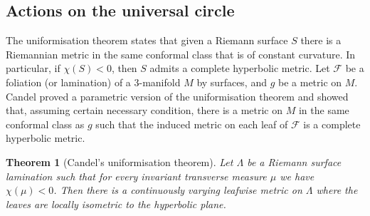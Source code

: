 \documentclass[11pt]{amsart}
\newtheorem{thm}{Theorem}[section]
\theoremstyle{remark}
\theoremstyle{definition}
\begin{document}
	\subsection{Actions on the universal circle}
	\label{sec:universal circle}
	
	The uniformisation theorem states that given a Riemann surface $S$ there is a Riemannian metric in the same conformal class that is of constant curvature. In particular, if $\chi(S) <0 $, then $S$ admits a complete hyperbolic metric. Let $\mathcal{F}$ be a foliation (or lamination) of a 3-manifold $M$ by surfaces, and $g$ be a metric on $M$. Candel \cite{candel2003foliations} proved a parametric version of the uniformisation theorem and showed that, assuming certain necessary condition, there is a metric on $M$ in the same conformal class as $g$ such that the induced metric on each leaf of $\mathcal{F}$ is a complete hyperbolic metric. 
	
	\begin{thm}[Candel's uniformisation theorem]
		Let $\Lambda$ be a Riemann surface lamination such that for every invariant transverse measure $\mu$ we have $\chi(\mu)<0$. Then there is a continuously varying leafwise metric on $\Lambda$ where the leaves are locally isometric to the hyperbolic plane. 
	\end{thm}	
	
\end{document}
